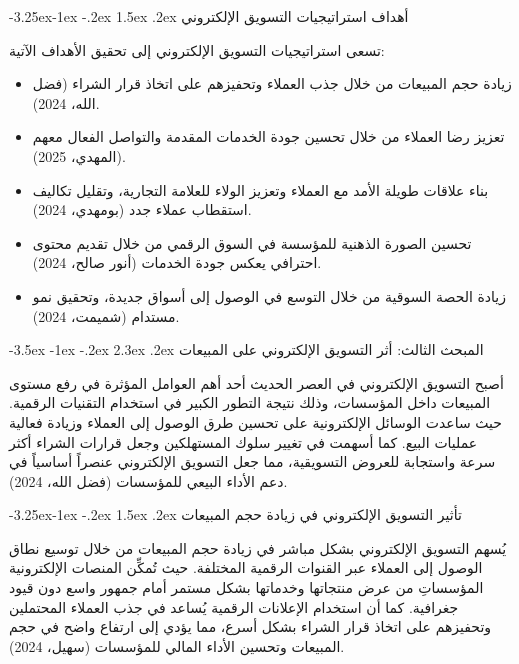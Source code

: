 \documentclass[12pt, a4paper]{report}
\makeatletter
\renewcommand\section{\@startsection{section}{1}{\z@}%
  {-3.5ex \@plus -1ex \@minus -.2ex}%
  {2.3ex \@plus .2ex}%
  {\normalfont\Large\bfseries\color{primaryblue}}}
\renewcommand\subsection{\@startsection{subsection}{2}{\z@}%
  {-3.25ex\@plus -1ex \@minus -.2ex}%
  {1.5ex \@plus .2ex}%
  {\normalfont\large\bfseries\color{sectiongray}}}
\makeatother
\begin{document}
\subsection{أهداف استراتيجيات التسويق الإلكتروني}

تسعى استراتيجيات التسويق الإلكتروني إلى تحقيق الأهداف الآتية:

\begin{itemize}
  \item زيادة حجم المبيعات من خلال جذب العملاء وتحفيزهم على اتخاذ قرار الشراء (فضل الله، 2024).
  \item تعزيز رضا العملاء من خلال تحسين جودة الخدمات المقدمة والتواصل الفعال معهم (المهدي، 2025).
  \item بناء علاقات طويلة الأمد مع العملاء وتعزيز الولاء للعلامة التجارية، وتقليل تكاليف استقطاب عملاء جدد (بومهدي، 2024).
  \item تحسين الصورة الذهنية للمؤسسة في السوق الرقمي من خلال تقديم محتوى احترافي يعكس جودة الخدمات (أنور صالح، 2024).
  \item زيادة الحصة السوقية من خلال التوسع في الوصول إلى أسواق جديدة، وتحقيق نمو مستدام (شميمت، 2024).
\end{itemize}

\section{المبحث الثالث: أثر التسويق الإلكتروني على المبيعات}

أصبح التسويق الإلكتروني في العصر الحديث أحد أهم العوامل المؤثرة في رفع مستوى المبيعات داخل المؤسسات، وذلك نتيجة التطور الكبير في استخدام التقنيات الرقمية. حيث ساعدت الوسائل الإلكترونية على تحسين طرق الوصول إلى العملاء وزيادة فعالية عمليات البيع. كما أسهمت في تغيير سلوك المستهلكين وجعل قرارات الشراء أكثر سرعة واستجابة للعروض التسويقية، مما جعل التسويق الإلكتروني عنصراً أساسياً في دعم الأداء البيعي للمؤسسات (فضل الله، 2024).

\subsection{تأثير التسويق الإلكتروني في زيادة حجم المبيعات}

يُسهم التسويق الإلكتروني بشكل مباشر في زيادة حجم المبيعات من خلال توسيع نطاق الوصول إلى العملاء عبر القنوات الرقمية المختلفة. حيث تُمكِّن المنصات الإلكترونية المؤسساتِ من عرض منتجاتها وخدماتها بشكل مستمر أمام جمهور واسع دون قيود جغرافية. كما أن استخدام الإعلانات الرقمية يُساعد في جذب العملاء المحتملين وتحفيزهم على اتخاذ قرار الشراء بشكل أسرع، مما يؤدي إلى ارتفاع واضح في حجم المبيعات وتحسين الأداء المالي للمؤسسات (سهيل، 2024).
\end{document}
